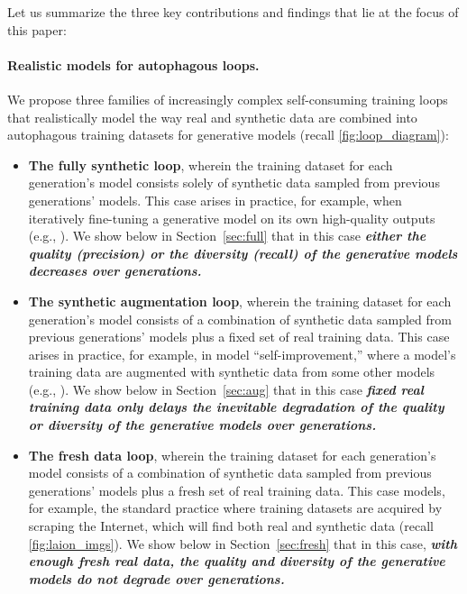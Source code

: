 \documentclass{article}
\def\colorSynthetic{colorA}
\def\colorMixed{colorB}
\def\colorFresh{colorC}
\def\synthetic{\textcolor{\colorSynthetic}{fully synthetic loop}}
\def\mixed{\textcolor{\colorMixed}{synthetic augmentation loop}}
\def\fresh{\textcolor{\colorFresh}{fresh data loop}}
\newcommand\josue[1]{{\color{orange}\sf{[Josue: #1]}}}
\newcommand\ali[1]{{\small\color{DarkGreen}\sf{[ali: #1]}}}
\newcommand\josue[1]{}
\begin{document}
Let us summarize the three key contributions and findings that lie at the focus of this paper:

\paragraph{Realistic models for autophagous loops.} 
%
We propose three families of increasingly complex self-consuming training loops that realistically model the way real and synthetic data are combined into autophagous training datasets for generative models (recall \cref{fig:loop_diagram}):
\begin{itemize}
    
\item \textbf{The \synthetic{}}, wherein the training dataset for each generation's model consists solely of synthetic data sampled from previous generations' models. 
This case arises in practice, for example, when iteratively fine-tuning a generative model on its own high-quality outputs (e.g., \cite{the_power_of_synthetic_data}).
We show below in Section~\ref{sec:full} that in this case {\bf\textit{either the quality (precision) or the diversity (recall) of the generative models decreases over generations.}}
    
\item \textbf{The \mixed{}}, wherein the training dataset for each generation's model consists of a combination of synthetic data sampled from previous generations' models plus a fixed set of real training data. 
This case arises in practice, for example, in model ``self-improvement,'' where a model's training data are augmented with synthetic data from some other models (e.g., \cite{llms_self_improve}). 
We show below in Section~\ref{sec:aug} that in this case {\bf\textit{fixed real training data only delays the inevitable degradation of the quality or diversity of the generative models over generations.}}

\item \textbf{The \fresh{}}, wherein the training dataset for each generation's model consists of a combination of synthetic data sampled from previous generations' models plus a fresh set of real training data. 
This case models, for example, the standard practice where training datasets are acquired by scraping the Internet, which will find both real and synthetic data (recall \cref{fig:laion_imgs}).
We show below in Section~\ref{sec:fresh} that in this case, {\bf\textit{with enough fresh real data, the quality and diversity of the generative models do not degrade over generations.}}
    
\end{itemize}
\end{document}
